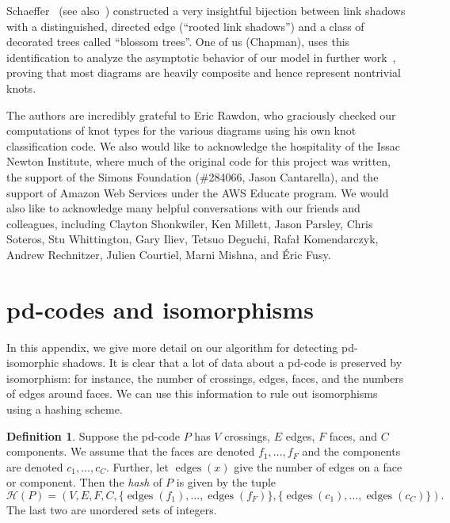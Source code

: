 \documentclass[amsmath,secnumarabic,amssymb,floatfix,nofootinbib,nobibnotes,letterpaper,11pt,tightenlines,showkeys]{revtex4}
\theoremstyle{definition}
\newtheorem{definition}[theorem]{Definition}
\newcommand{\pdcode}{pd-code }
\newcommand{\edges}{\operatorname{edges}}
\let\mgp=\marginpar \marginparwidth18mm \marginparsep1mm
\def\marginpar#1{\mgp{\raggedright\tiny #1}}
\let\lbl=\label
\def\label#1{\lbl{#1}\ifinner\else\marginpar{\ref{#1} #1}\ignorespaces\fi}
\begin{document}
Schaeffer~\cite{Schaeffer:1997wo} (see also~\cite{Bouttier:2002iu}) constructed a very insightful bijection between link shadows with a distinguished, directed edge (``rooted link shadows'') and a class of decorated trees called ``blossom trees''. One of us (Chapman), uses this identification to analyze the asymptotic behavior of our model in further work~\cite{Chapman2015knotasymp}, proving that most diagrams are heavily composite and hence represent nontrivial knots.

\acknowledgments
The authors are incredibly grateful to Eric Rawdon, who graciously checked our computations of knot types for the various diagrams using his own knot classification code. We also would like to acknowledge the hospitality of the Issac Newton Institute, where much of the original code for this project was written, the support of the Simons Foundation (\#284066, Jason Cantarella), and the support of Amazon Web Services under the AWS Educate program. We would also like to acknowledge many helpful conversations with our friends and colleagues, including Clayton Shonkwiler, Ken Millett, Jason Parsley, Chris Soteros, Stu Whittington, Gary Iliev, Tetsuo Deguchi, Rafa\l{} Komendarczyk, Andrew Rechnitzer, Julien Courtiel, Marni Mishna, and \'Eric Fusy.

\appendix
\section{pd-codes and isomorphisms}
\label{app:pdcodes}

In this appendix, we give more detail on our algorithm for detecting pd-isomorphic shadows. It is clear that a lot of data about a \pdcode is preserved by isomorphism: for instance, the number of crossings, edges, faces, and the numbers of edges around faces. We can use this information to rule out isomorphisms using a hashing scheme.

\begin{definition}
Suppose the \pdcode $P$ has $V$ crossings, $E$ edges, $F$ faces, and $C$ components. We assume that the faces are denoted $f_1, \dots, f_F$ and the components are denoted $c_1, \dots, c_C$. Further, let $\edges(x)$ give the number of edges on a face or component. Then the \emph{hash} of $P$ is given by the tuple
\begin{equation*}
\mathcal{H}(P) = (V,E,F,C,\{ \edges(f_1), \dots, \edges(f_F) \},
 \{ \edges(c_1), \dots, \edges(c_C) \}).
\end{equation*}
The last two are unordered sets of integers.
\end{definition}
\end{document}

